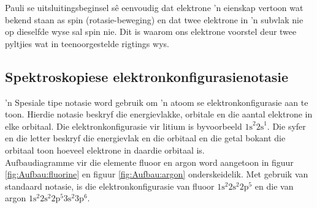 Pauli se uitsluitingsbeginsel sê eenvoudig dat elektrone 'n eienskap vertoon wat bekend staan as spin (rotasie-beweging) en dat twee elektrone in 'n subvlak nie op dieselfde wyse sal spin nie. Dit is waarom ons elektrone voorstel deur twee pyltjies wat in teenoorgestelde rigtings wys.
\par 


\subsection*{Spektroskopiese elektron\-kon\-fig\-u\-ra\-sie\-no\-ta\-sie}
\label{m38741*id259749}
 'n Spesiale tipe notasie word gebruik om 'n atoom se elektronkonfigurasie aan te toon. Hierdie notasie beskryf die energievlakke, orbitale en die aantal elektrone in elke orbitaal. Die elektronkonfigurasie vir litium is byvoorbeeld ${1\text{s}}^{2}{2\text{s}}^{1}$. Die syfer en die letter beskryf die energievlak en die orbitaal en die getal bokant die orbitaal toon hoeveel elektrone in daardie orbitaal is.\\
Aufbaudiagramme vir die elemente fluoor en argon word aangetoon in figuur \ref{fig:Aufbau:fluorine} en figuur \ref{fig:Aufbau:argon} onderskeidelik. Met gebruik van standaard notasie, is die elektronkonfigurasie van fluoor $1\text{s}^{2}{2}\text{s}^{2}2\text{p}^{5}$ en die van argon $1\text{s}^{2}{2}\text{s}^{2}2\text{p}^{5}{3}\text{s}^{2}3\text{p}^{6}$.\\
